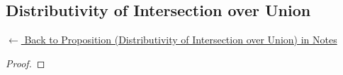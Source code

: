 
\subsection*{Distributivity of Intersection over Union}
\label{prf:dist-cap-over-cup}

\begin{remark*}[Return]
\hyperref[prop:dist-cap-over-cup]{$\leftarrow$ Back to Proposition (Distributivity of Intersection over Union) in Notes}
\end{remark*}

\begin{proof}
\end{proof}

\begin{remark*}

\end{remark*}

\begin{remark*}[Dependencies]

\FlashUses{}
\end{remark*}
